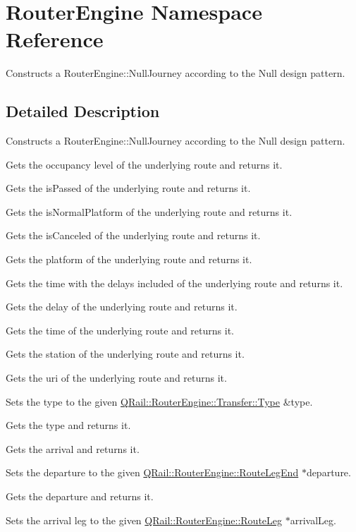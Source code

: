 \hypertarget{namespaceRouterEngine}{}\section{Router\+Engine Namespace Reference}
\label{namespaceRouterEngine}


Constructs a Router\+Engine\+::\+Null\+Journey according to the Null design pattern.  




\subsection{Detailed Description}
Constructs a Router\+Engine\+::\+Null\+Journey according to the Null design pattern. 

Gets the occupancy level of the underlying route and returns it.

Gets the is\+Passed of the underlying route and returns it.

Gets the is\+Normal\+Platform of the underlying route and returns it.

Gets the is\+Canceled of the underlying route and returns it.

Gets the platform of the underlying route and returns it.

Gets the time with the delays included of the underlying route and returns it.

Gets the delay of the underlying route and returns it.

Gets the time of the underlying route and returns it.

Gets the station of the underlying route and returns it.

Gets the uri of the underlying route and returns it.

Sets the type to the given \mbox{\hyperlink{classQRail_1_1RouterEngine_1_1Transfer_a5a0b372acbdfb9381fb937bf163edfa6}{Q\+Rail\+::\+Router\+Engine\+::\+Transfer\+::\+Type}} \&type.

Gets the type and returns it.

Gets the arrival and returns it.

Sets the departure to the given \mbox{\hyperlink{classQRail_1_1RouterEngine_1_1RouteLegEnd}{Q\+Rail\+::\+Router\+Engine\+::\+Route\+Leg\+End}} $\ast$departure.

Gets the departure and returns it.

Sets the arrival leg to the given \mbox{\hyperlink{classQRail_1_1RouterEngine_1_1RouteLeg}{Q\+Rail\+::\+Router\+Engine\+::\+Route\+Leg}} $\ast$arrival\+Leg.

